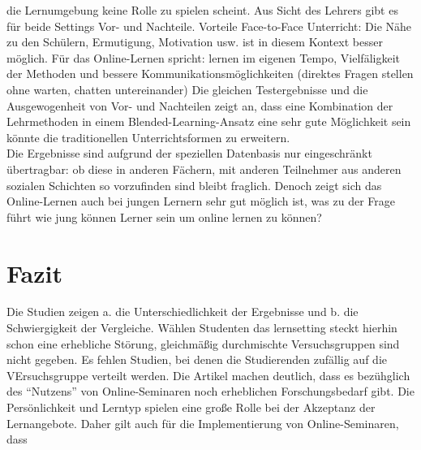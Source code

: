 \documentclass[12pt, bibliography=totoc]{scrartcl}
\begin{document}
die Lernumgebung keine Rolle zu spielen scheint. Aus Sicht des Lehrers
gibt es für beide Settings Vor- und Nachteile. Vorteile Face-to-Face
Unterricht: Die Nähe zu den Schülern, Ermutigung, Motivation usw. ist in
diesem Kontext besser möglich. Für das Online-Lernen spricht: lernen im
eigenen Tempo, Vielfäligkeit der Methoden und bessere
Kommunikationsmöglichkeiten (direktes Fragen stellen ohne warten,
chatten untereinander) Die gleichen Testergebnisse und die
Ausgewogenheit von Vor- und Nachteilen zeigt an, dass eine Kombination
der Lehrmethoden in einem Blended-Learning-Ansatz eine sehr gute
Möglichkeit sein könnte die traditionellen Unterrichtsformen zu
erweitern.\\Die Ergebnisse sind aufgrund der speziellen Datenbasis nur
eingeschränkt übertragbar: ob diese in anderen Fächern, mit anderen
Teilnehmer aus anderen sozialen Schichten so vorzufinden sind bleibt
fraglich. Denoch zeigt sich das Online-Lernen auch bei jungen Lernern
sehr gut möglich ist, was zu der Frage führt wie jung können Lerner sein
um online lernen zu können?

\section{Fazit}\label{fazit}

Die Studien zeigen a. die Unterschiedlichkeit der Ergebnisse und b. die
Schwiergigkeit der Vergleiche. Wählen Studenten das lernsetting steckt
hierhin schon eine erhebliche Störung, gleichmäßig durchmischte
Versuchsgruppen sind nicht gegeben. Es fehlen Studien, bei denen die
Studierenden zufällig auf die VErsuchsgruppe verteilt werden. Die
Artikel machen deutlich, dass es bezühglich des ``Nutzens'' von
Online-Seminaren noch erheblichen Forschungsbedarf gibt. Die
Persönlichkeit und Lerntyp spielen eine große Rolle bei der Akzeptanz
der Lernangebote. Daher gilt auch für die Implementierung von
Online-Seminaren, dass
\pagebreak
\printbibliography
\pagebreak
%
%
\end{document}
